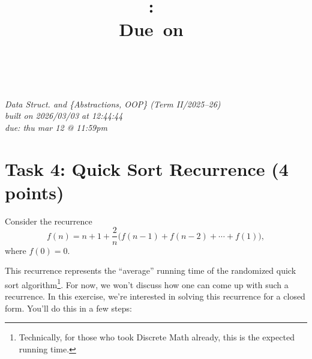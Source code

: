 \documentclass{article}
\title{
    \vspace{2in}
    \textmd{\textbf{\hmwkClass:\ \hmwkTitle}}\\
    \normalsize\vspace{0.1in}\small{Due\ on\ \hmwkDueDate}\\
    \vspace{0.1in}\large{\textit{\hmwkClassInstructor\ \hmwkClassTime}}
    \vspace{3in}
}
\author{\hmwkAuthorName}
\date{}
\theoremstyle{remark}
\begin{document}
\maketitle
\begin{center}
    \textit{Data Struct. and \{Abstractions, OOP\} (Term II/2025--26)}\\
    \textit{built on 2026/03/03 at 12:44:44}\\
    \textit{due: thu mar 12 @ 11:59pm}
\end{center}
\newpage

\section*{Task 4: Quick Sort Recurrence (4 points)}

Consider the recurrence
\[
    f(n) = n + 1 + \frac{2}{n} \bigl(f(n - 1) + f(n - 2) + \cdots + f(1)\bigr),
\]
where $f(0) = 0$.

This recurrence represents the ``average'' running time of the randomized quick sort algorithm\footnote{Technically, for those who took Discrete Math already, this is the expected running time.}. For now, we won't discuss how one can come up with such a recurrence. In this exercise, we're interested in solving this recurrence for a closed form. You'll do this in a few steps:
\end{document}

